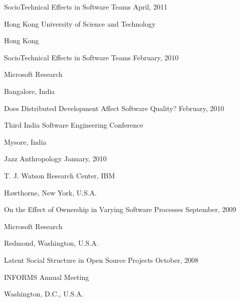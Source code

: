 \documentclass[margin,line,article,letterpaper]{res}
\newenvironment{list1}{
  \begin{list}{}{%
      \setlength{\itemsep}{0in}
      \setlength{\parsep}{0in} \setlength{\parskip}{0in}
      \setlength{\topsep}{0in} \setlength{\partopsep}{0in} 
      \setlength{\leftmargin}{0.17in}}}{\end{list}}
\newcommand{\timespan}[1]{#1}
\begin{document}
\begin{resume}
SocioTechnical Effects in Software Teams \hfill \timespan{April, 2011}\\
\vspace{-10pt}
\begin{list1}
\item Hong Kong University of Science and Technology
\item Hong Kong
\end{list1}

SocioTechnical Effects in Software Teams \hfill \timespan{February, 2010}\\
\vspace{-10pt}
\begin{list1}
\item Microsoft Research
\item Bangalore, India
\end{list1}

Does Distributed Development Affect Software Quality? \hfill \timespan{February, 2010}\\
\vspace{-10pt}
\begin{list1}
\item Third India Software Engineering Conference
\item Mysore, India
\end{list1}

Jazz Anthropology \hfill \timespan{January, 2010}\\
\vspace{-10pt}
\begin{list1}
\item T. J. Watson Research Center, IBM
\item Hawthorne, New York, U.S.A.
\end{list1}

On the Effect of Ownership in Varying Software Processes \hfill \timespan{September, 2009}\\
\vspace{-10pt}
\begin{list1}
\item Microsoft Research
\item Redmond, Washington, U.S.A.
\end{list1}

Latent Social Structure in Open Source Projects \hfill \timespan{October, 2008}\\
\vspace{-10pt}
\begin{list1}
\item INFORMS Annual Meeting
\item Washington, D.C., U.S.A.
\end{list1}


\end{resume}
\end{document}
